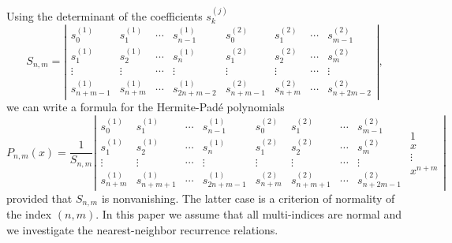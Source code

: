 \documentclass{amsart}
\theoremstyle{remark}
\numberwithin{equation}{section}
\begin{document}
Using the determinant of the coefficients $s_k^{(j)}$
\begin{equation} \label{eq:2.12}
   S_{n,m} = \left| \begin{matrix}
                   s_0^{(1)} & s_1^{(1)} & \cdots & s_{n-1}^{(1)} \\
                   s_1^{(1)} & s_2^{(1)} & \cdots & s_{n}^{(1)} \\
	            \vdots & \vdots & \cdots & \vdots \\
                   s_{n+m-1}^{(1)} & s_{n+m}^{(1)} & \cdots & s_{2n+m-2}^{(1)} \end{matrix}		
           \begin{matrix}
                   s_0^{(2)} & s_1^{(2)} & \cdots & s_{m-1}^{(2)} \\
                   s_1^{(2)} & s_2^{(2)} & \cdots & s_{m}^{(2)} \\
	            \vdots & \vdots & \cdots & \vdots \\
                   s_{n+m-1}^{(2)} & s_{n+m}^{(2)} & \cdots & s_{n+2m-2}^{(2)} 		
                  \end{matrix} \right|,
\end{equation}
we can write a formula for the {Her\-mite-Pad\'e}{} polynomials
\small
\[    P_{n,m}(x) = \frac{1}{S_{n,m}}
          \left|\begin{matrix}
                   s_0^{(1)} & s_1^{(1)} & \cdots & s_{n-1}^{(1)} \\
                   s_1^{(1)} & s_2^{(1)} & \cdots & s_{n}^{(1)} \\
	            \vdots & \vdots & \cdots & \vdots \\
                   s_{n+m}^{(1)} & s_{n+m+1}^{(1)} & \cdots & s_{2n+m-1}^{(1)} \end{matrix}		
           \begin{matrix}
                   s_0^{(2)} & s_1^{(2)} & \cdots & s_{m-1}^{(2)} \\
                   s_1^{(2)} & s_2^{(2)} & \cdots & s_{m}^{(2)} \\
	            \vdots & \vdots & \cdots & \vdots \\
                   s_{n+m}^{(2)} & s_{n+m+1}^{(2)} & \cdots & s_{n+2m-1}^{(2)} 		
                  \end{matrix}
          \begin{matrix} 1 \\ x \\ \vdots \\ x^{n+m} \end{matrix} \right|
\]
\normalsize
provided that $S_{n,m}$ is nonvanishing. The latter case is a criterion of normality of the index $(n,m)$.
In this paper we assume that
all multi-indices are normal and we investigate the nearest-neighbor recurrence relations.
\end{document}
